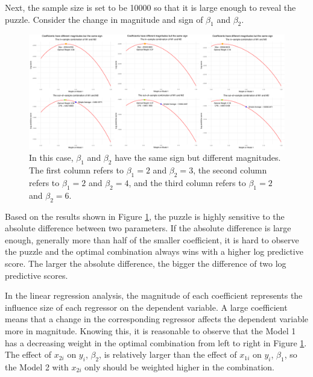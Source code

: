 \documentclass{monashthesis}
\begin{document}
Next, the sample size is set to be 10000 so that it is large enough to reveal the puzzle. Consider the change in magnitude and sign of \(\beta_1\) and \(\beta_2\).

\begin{figure}[ht]
\centering
\includegraphics[scale=0.35]{figures/Beta_diff_mag.png}
\caption{In this case, $\beta_1$ and $\beta_2$ have the same sign but different magnitudes. The first column refers to $\beta_1=2$ and $\beta_2=3$, the second column refers to $\beta_1=2$ and $\beta_2=4$, and the third column refers to $\beta_1=2$ and $\beta_2=6$.}
\label{fig:magnitude}
\end{figure}

Based on the results shown in Figure \ref{fig:magnitude}, the puzzle is highly sensitive to the absolute difference between two parameters. If the absolute difference is large enough, generally more than half of the smaller coefficient, it is hard to observe the puzzle and the optimal combination always wins with a higher log predictive score. The larger the absolute difference, the bigger the difference of two log predictive scores.

In the linear regression analysis, the magnitude of each coefficient represents the influence size of each regressor on the dependent variable. A large coefficient means that a change in the corresponding regressor affects the dependent variable more in magnitude. Knowing this, it is reasonable to observe that the Model 1 has a decreasing weight in the optimal combination from left to right in Figure \ref{fig:magnitude}. The effect of \(x_{2i}\) on \(y_i\), \(\beta_2\), is relatively larger than the effect of \(x_{1i}\) on \(y_i\), \(\beta_1\), so the Model 2 with \(x_{2i}\) only should be weighted higher in the combination.
\end{document}
